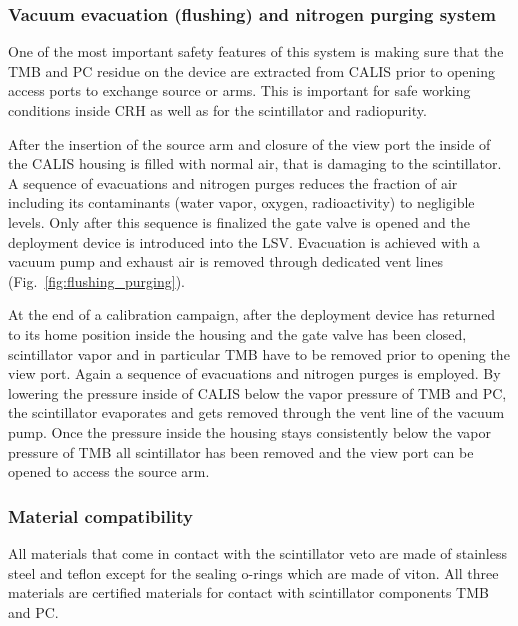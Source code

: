 \subsubsection*{Vacuum evacuation (flushing) and nitrogen purging system}\label{sec:EvacPurge}
One of the most important safety features of this system is making sure that the TMB and PC residue on the device are extracted from CALIS prior to opening access ports to exchange source or arms. This is  important for safe working conditions inside CRH as well as for the scintillator and radiopurity. 

After the insertion of the source arm and closure of the view port the inside of the CALIS housing is filled with normal air, that is damaging to the scintillator. A sequence of evacuations and nitrogen purges reduces the fraction of air including its contaminants (water vapor, oxygen, radioactivity) to negligible levels. Only after this sequence is finalized the gate valve is opened and the deployment device is introduced into the LSV. Evacuation is achieved with a vacuum pump and exhaust air is removed through dedicated vent lines (Fig.~\ref{fig:flushing_purging}).

At the end of a calibration campaign, after the deployment device has returned to its home position inside the housing and the gate valve has been closed, scintillator vapor and in particular TMB have to be removed prior to opening the view port. Again a sequence of evacuations and nitrogen purges is employed. By lowering the pressure inside of CALIS below the vapor pressure of TMB and PC, the scintillator evaporates and gets removed through the vent line of the vacuum pump. Once the pressure inside the housing stays consistently below the vapor pressure of TMB all scintillator has been removed and the view port can be opened to access the source arm.
 

\subsubsection*{Material compatibility}
All materials that come in contact with the scintillator veto are made of stainless steel and teflon except for the sealing o-rings which are made of viton.  All three materials are certified materials for contact with scintillator components TMB and PC.

